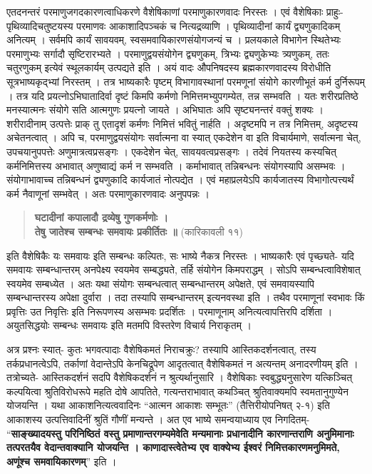 {एतदनन्तरं परमाणुजगदकारणत्वाधिकरणे वैशेषिकाणां परमाणुकारणवादः निरस्तः । एवं वैशेषिकाः प्राहुः- पृथिव्यादिचतुष्टयस्य परमाणवः आकाशादिपञ्चकं च नित्यद्रव्याणि । पृथिव्यादीनां कार्यं द्व्यणुकादिकम् अनित्यम् । सर्वमपि कार्यं सावयवम्, स्वसमवायिकारणसंयोगजन्यं च । प्रलयकाले विभागेन स्थितेभ्यः परमाणुभ्यः सर्गादौ सृष्टिरारभ्यते । परमाणुद्वयसंयोगेन द्व्यणुकम्, त्रिभ्यः द्व्यणुकेभ्यः त्र्यणुकम्, ततः चतुरणुकम् इत्येवं स्थूलकार्यम् उत्पद्यते इति । अयं वादः औपनिषदस्य ब्रह्मकारणवादस्य विरोधीति सूत्रभाष्यकृद्भ्यां निरस्तम् । तत्र भाष्यकारैः पृष्टम् विभागावस्थानां परमणूनां संयोगे कारणीभूतं कर्म दुर्निरूपम् । तत्र यदि प्रयत्नोऽभिघातादिर्वा दृष्टं किमपि कर्मणो निमित्तमभ्युपगम्येत, तन्न सम्भवति । यतः शरीरप्रतिष्ठे मनस्यात्मनः संयोगे सति आत्मगुणः प्रयत्नो जायते । अभिघातः अपि सृष्ट्यनन्तरं वक्तुं शक्यः । शरीरादीनाम् उत्पत्तेः प्राक् तु एतादृशं कर्मणः निमित्तं भवितुं नार्हति । अदृष्टमपि न तत्र निमित्तम्, अदृष्टस्य अचेतनत्वात् । अपि च, परमाणुद्वयसंयोगः सर्वात्मना वा स्यात् एकदेशेन वा इति विचार्यमाणे, सर्वात्मना चेत्, उपचयानुपपत्तेः अणुमात्रत्वप्रसङ्गः । एकदेशेन चेत्, सावयवत्वप्रसङ्गः । तदेवं नियतस्य कस्यचित् कर्मनिमित्तस्य अभावात् अणुष्वाद्यं कर्म न सम्भवति । कर्माभावात् तन्निबन्धनः संयोगस्यापि असम्भवः । संयोगाभावाच्च तन्निबन्धनं द्व्यणुकादि कार्यजातं नोत्पद्येत । एवं महाप्रलयेऽपि कार्यजातस्य विभागोत्पत्त्यर्थं कर्म नैवाणूनां सम्भवेत् । अतः परमाणुकारणवादः अनुपपन्नः ।
\begin{verse}
\textbf{घटादीनां कपालादौ द्रव्येषु गुणकर्मणोः ।\\
तेषु जातेश्च सम्बन्धः समवायः प्रकीर्तितः ॥} (कारिकावली ११)
\end{verse}
इति वैशेषिकैः यः समवायः इति सम्बन्धः कल्पितः, सः भाष्ये नैकत्र निरस्तः । भाष्यकारैः एवं पृच्छ्यते- यदि समवायः सम्बन्धान्तरम् अनपेक्ष्य स्वयमेव सम्बद्ध्यते, तर्हि संयोगेन किमपराद्धम् । सोऽपि सम्बन्धत्वाविशेषात् स्वयमेव सम्बध्येत । अतः यथा संयोगः सम्बन्धत्वात् सम्बन्धान्तरम् अपेक्षते, एवं समवायस्यापि सम्बन्धान्तरस्य अपेक्षा दुर्वारा । तदा तस्यापि सम्बन्धान्तरम् इत्यनवस्था इति । तथैव परमाणूनां स्वभावः किं प्रवृत्तिः उत निवृत्तिः इति निरूपणस्य असम्भवः प्रदर्शितः । परमाणूनाम् अनित्यत्वापत्तिरपि दर्शिता । अयुतसिद्धयोः सम्बन्धः समवायः इति मतमपि विस्तरेण विचार्य निराकृतम् ।

अत्र प्रश्नः स्यात्- कुतः भगवत्पादाः वैशेषिकमतं निराचक्रुः? तस्यापि आस्तिकदर्शनत्वात्, तस्य तर्कप्रधानत्वेऽपि, तर्काणां वेदान्तेऽपि केनचिद्रूपेण आदृतत्वात् वैशेषिकमतं न अत्यन्तम् अनादरणीयम् इति । तत्रोच्यते- आस्तिकदर्शनं सदपि वैशेषिकदर्शनं न श्रुत्यर्थानुसारि । वैशेषिकाः स्वबुद्ध्यनुसारेण यत्किञ्चित् कल्पयित्वा श्रुतिविरोधरूपे महति दोषे आपतिते, गत्यन्तराभावात् कथञ्चित् श्रुतिवाक्यमपि स्वमतानुगुण्येन योजयन्ति । यथा आकाशनित्यत्ववादिनः “आत्मन आकाशः सम्भूतः” (तैत्तिरीयोपनिषत् २-१) इति आकाशस्य उत्पत्तिवादिनीं श्रुतिं गौणीं मन्यन्ते । अत एव भाष्ये समन्वयाध्याय एव निगदितम्- “\textbf{साङ्ख्यादयस्तु परिनिष्ठितं वस्तु प्रमाणान्तरगम्यमेवेति मन्यमानाः प्रधानादीनि कारणान्तराणि अनुमिमानाः तत्परतयैव वेदान्तवाक्यानि योजयन्ति । काणादास्त्वेतेभ्य एव वाक्येभ्य ईश्वरं निमित्तकारणमनुमिमते, अणूंश्च समवायिकारणम्}” इति ।

}
